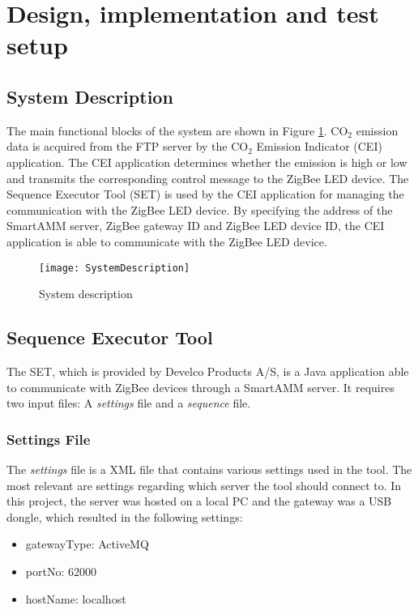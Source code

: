 \documentclass[Main]{subfiles}
\begin{document}
\section{Design, implementation and test setup} %
\label{sec:design_implementation_test_setup}

	\subsection{System Description}
		The main functional blocks of the system are shown in Figure \ref{fig:sysDesc}. 
		CO$_2$ emission data is acquired from the FTP server by the CO$_2$ Emission Indicator (CEI) application. 
		The CEI application determines whether the emission is high or low and transmits the corresponding control message to the ZigBee LED device. 
		The Sequence Executor Tool (SET) is used by the CEI application for managing the communication with the ZigBee LED device. 
		By specifying the address of the SmartAMM server, ZigBee gateway ID and ZigBee LED device ID, the CEI application is able to communicate with the ZigBee LED device.  

		\begin{figure}[H]
		\centering
		\texttt{[image: SystemDescription]}
		\caption{System description}
		\label{fig:sysDesc}
		\end{figure}




	 


	\newpage
	\subsection{Sequence Executor Tool}
		The SET, which is provided by Develco Products A/S, is a Java application able to communicate with ZigBee devices through a SmartAMM server.
		It requires two input files: A \emph{settings} file and a \emph{sequence} file.

		\subsubsection{Settings File}
			The \emph{settings} file is a XML file that contains various settings used in the tool. 
			The most relevant are settings regarding which server the tool should connect to. 
			In this project, the server was hosted on a local PC and the gateway was a USB dongle, which resulted in the following settings:
			\begin{itemize}
				\item gatewayType: ActiveMQ
				\item portNo: 62000
				\item hostName: localhost
			\end{itemize}
\end{document}
